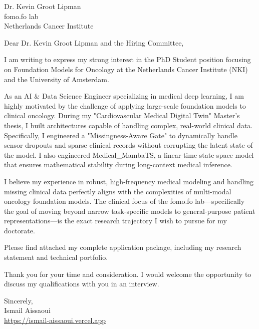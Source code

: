 \documentclass[11pt, a4paper]{letter}
\begin{document}
\begin{letter}{Dr. Kevin Groot Lipman \\ fomo.fo lab \\ Netherlands Cancer Institute}
\opening{Dear Dr. Kevin Groot Lipman and the Hiring Committee,}

I am writing to express my strong interest in the PhD Student position focusing on Foundation Models for Oncology at the Netherlands Cancer Institute (NKI) and the University of Amsterdam.

As an AI \& Data Science Engineer specializing in medical deep learning, I am highly motivated by the challenge of applying large-scale foundation models to clinical oncology. During my "Cardiovascular Medical Digital Twin" Master's thesis, I built architectures capable of handling complex, real-world clinical data. Specifically, I engineered a "Missingness-Aware Gate" to dynamically handle sensor dropouts and sparse clinical records without corrupting the latent state of the model. I also engineered Medical\_MambaTS, a linear-time state-space model that ensures mathematical stability during long-context medical inference. 

I believe my experience in robust, high-frequency medical modeling and handling missing clinical data perfectly aligns with the complexities of multi-modal oncology foundation models. The clinical focus of the fomo.fo lab—specifically the goal of moving beyond narrow task-specific models to general-purpose patient representations—is the exact research trajectory I wish to pursue for my doctorate.

Please find attached my complete application package, including my research statement and technical portfolio. 

Thank you for your time and consideration. I would welcome the opportunity to discuss my qualifications with you in an interview.

\closing{Sincerely, \\ Ismail Aissaoui \\ \href{https://ismail-aissaoui.vercel.app}{https://ismail-aissaoui.vercel.app}}
\end{letter}
\end{document}
